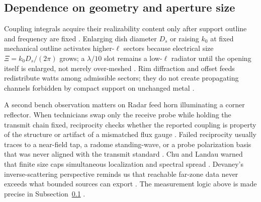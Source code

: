 \subsection{Dependence on geometry and aperture size}
\label{sec:ch453}
Coupling integrals acquire their realizability content only after support outline and frequency are fixed \cite{stratton1941}. Enlarging dish diameter $D_s$ or raising $k_0$ at fixed mechanical outline activates higher-$\ell$ sectors because electrical size $\Xi=k_0 D_s/(2\pi)$ grows; a $\lambda/10$ slot remains a low-$\ell$ radiator until the opening itself is enlarged, not merely over-meshed \cite{chu1948}. Rim diffraction and offset feeds redistribute watts among admissible sectors; they do not create propagating channels forbidden by compact support on unchanged metal \cite{devaney2004}.
\begin{physicalvignette}
A second bench observation matters on Radar feed horn illuminating a corner reflector. When technicians swap only the receive probe while holding the transmit chain fixed, reciprocity checks whether the reported coupling is property of the structure or artifact of a mismatched flux gauge \cite{stratton1941}. Failed reciprocity usually traces to a near-field tap, a radome standing-wave, or a probe polarization basis that was never aligned with the transmit standard \cite{hansen1988}.
Chu and Landau warned that finite size caps simultaneous localization and spectral spread \cite{chu1948}. Devaney's inverse-scattering perspective reminds us that reachable far-zone data never exceeds what bounded sources can export \cite{devaney2004}.
The measurement logic above is made precise in Subsection~\ref{sec:ch453} \cite{stratton1941}.
\end{physicalvignette}
